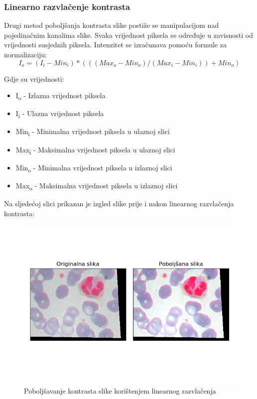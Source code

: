 \documentclass[12pt,a4paper]{article}
\begin{document}
\subsubsection{Linearno razvlačenje kontrasta}

Drugi metod poboljšanja kontrasta slike postiže se manipulacijom nad pojedinačnim kanalima slike. Svaka vrijednost piksela se određuje u zavisnosti od vrijednosti susjednih piksela. Intenzitet se izračunava pomoću formule za normalizaciju:
\[
	I_o = (I_i - Min_i) * (((Max_o - Min_o) / (Max_i - Min_i)) + Min_o)
\]

Gdje su vrijednosti:

\begin{itemize}
\item I\textsubscript{o} - Izlazna vrijednost piksela
\item I\textsubscript{i} - Ulazna vrijednost piksela
\item Min\textsubscript{i} - Minimalna vrijednost piksela u ulaznoj slici
\item Max\textsubscript{i} - Maksimalna vrijednost piksela u ulaznoj slici
\item Min\textsubscript{o} - Minimalna vrijednost piksela u izlaznoj slici
\item Max\textsubscript{o} - Maksimalna vrijednost piksela u izlaznoj slici
\end{itemize}

Na sljedećoj slici prikazan je izgled slike prije i nakon linearnog razvlačenja kontrasta:

\begin{figure}[H]

	\center
	\includegraphics[scale=0.9]{s3Kontrast2.png}
	\caption{Poboljšavanje kontrasta slike korištenjem linearnog razvlačenja}
	
\end{figure}
\end{document}
